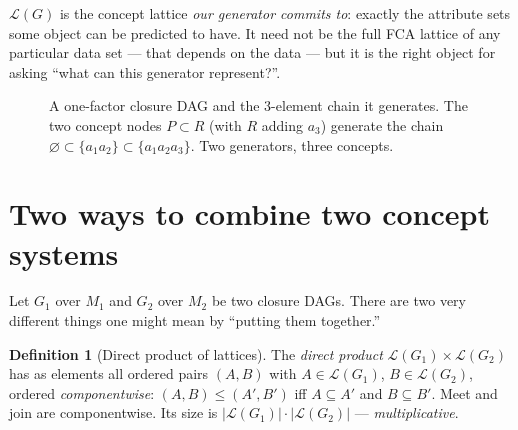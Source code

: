 \documentclass[11pt]{article}
\theoremstyle{definition}
\newtheorem{definition}{Definition}
\theoremstyle{plain}
\theoremstyle{remark}
\newcommand{\cl}{\operatorname{cl}}       %
\newcommand{\Lgen}{\mathcal{L}}            %
\newcommand{\attrs}{M}
\begin{document}
$\Lgen(G)$ is the concept lattice \emph{our generator commits to}: exactly the
attribute sets some object can be predicted to have. It need not be the full FCA
lattice of any particular data set --- that depends on the data --- but it is the
right object for asking ``what can this generator represent?''.

\begin{figure}[h]
\centering
{}
\caption{A one-factor closure DAG and the $3$-element chain it generates. The two
concept nodes $P\subset R$ (with $R$ adding $a_3$) generate the chain
$\varnothing\subset\{a_1a_2\}\subset\{a_1a_2a_3\}$. Two generators, three
concepts.}
\label{fig:onefactor}
\end{figure}

\section{Two ways to combine two concept systems}

Let $G_1$ over $\attrs_1$ and $G_2$ over $\attrs_2$ be two closure DAGs. There
are two very different things one might mean by ``putting them together.''

\begin{definition}[Direct product of lattices]
The \emph{direct product} $\Lgen(G_1)\times\Lgen(G_2)$ has as elements all ordered
pairs $(A,B)$ with $A\in\Lgen(G_1)$, $B\in\Lgen(G_2)$, ordered
\emph{componentwise}: $(A,B)\le(A',B')$ iff $A\subseteq A'$ and $B\subseteq B'$.
Meet and join are componentwise. Its size is
$|\Lgen(G_1)|\cdot|\Lgen(G_2)|$ --- \emph{multiplicative}.
\end{definition}
\end{document}
